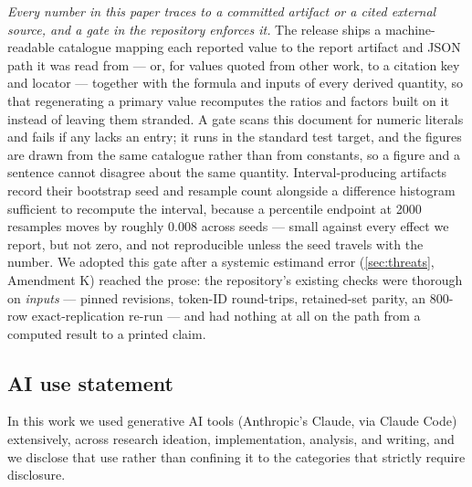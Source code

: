 \documentclass{article}
\begin{document}
\emph{Every number in this paper traces to a committed artifact or a cited external source, and a gate in the repository enforces it.} The release ships a machine-readable catalogue mapping each reported value to the report artifact and JSON path it was read from --- or, for values quoted from other work, to a citation key and locator --- together with the formula and inputs of every derived quantity, so that regenerating a primary value recomputes the ratios and factors built on it instead of leaving them stranded. A gate scans this document for numeric literals and fails if any lacks an entry; it runs in the standard test target, and the figures are drawn from the same catalogue rather than from constants, so a figure and a sentence cannot disagree about the same quantity. Interval-producing artifacts record their bootstrap seed and resample count alongside a difference histogram sufficient to recompute the interval, because a percentile endpoint at 2000 resamples moves by roughly $0.008$ across seeds --- small against every effect we report, but not zero, and not reproducible unless the seed travels with the number. We adopted this gate after a systemic estimand error (\cref{sec:threats}, Amendment K) reached the prose: the repository's existing checks were thorough on \emph{inputs} --- pinned revisions, token-ID round-trips, retained-set parity, an 800-row exact-replication re-run --- and had nothing at all on the path from a computed result to a printed claim.

\subsection*{AI use statement}

In this work we used generative AI tools (Anthropic's Claude, via Claude Code) extensively, across research ideation, implementation, analysis, and writing, and we disclose that use rather than confining it to the categories that strictly require disclosure.
\end{document}

